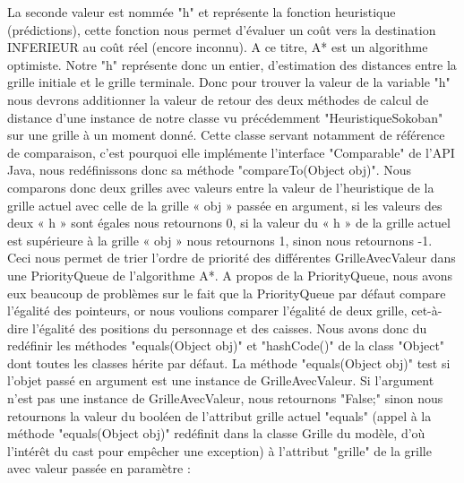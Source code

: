 \documentclass[a4paper,12pt]{article} %
\begin{document}
\newline\newline
La seconde valeur est nommée "h" et représente la fonction heuristique (prédictions), cette fonction nous permet d’évaluer un coût vers la destination INFERIEUR au coût réel (encore inconnu).
\newline
A ce titre, A* est un algorithme optimiste.
\newline
Notre "h" représente donc un entier, d’estimation des distances entre la grille initiale et le grille terminale.
\newline
Donc pour trouver la valeur de la variable "h" nous devrons additionner la valeur de retour des deux méthodes de calcul de distance d’une instance de notre classe vu précédemment "HeuristiqueSokoban" sur une grille à un moment donné. 
\newline\newline
Cette classe servant notamment de référence de comparaison, c'est pourquoi elle implémente l’interface "Comparable" de l’API Java, nous redéfinissons donc sa méthode "compareTo(Object obj)". 
\newline\newline
Nous comparons donc deux grilles avec valeurs entre la valeur de l’heuristique de la grille actuel avec celle de la grille « obj » passée en argument, si les valeurs des deux « h » sont égales nous retournons 0, si la valeur du « h » de la grille actuel est supérieure à la grille « obj » nous retournons 1, sinon nous retournons -1.
\newline\newline
Ceci nous permet de trier l’ordre de priorité des différentes GrilleAvecValeur dans une PriorityQueue de l’algorithme A*.
\newline\newline
A propos de la PriorityQueue, nous avons eux beaucoup de problèmes sur le fait que la PriorityQueue par défaut compare l’égalité des pointeurs, or nous voulions comparer l’égalité de deux grille, cet-à-dire l’égalité des positions du personnage et des caisses.
\newline\newline
Nous avons donc du redéfinir les méthodes "equals(Object obj)" et "hashCode()" de la class "Object" dont toutes les classes hérite par défaut.
\newline\newline 
La méthode "equals(Object obj)" test si l’objet passé en argument est une instance de GrilleAvecValeur. Si l'argument n'est pas une instance de GrilleAvecValeur, nous retournons "False;" sinon nous retournons la valeur du booléen de l’attribut grille actuel "equals" (appel à la méthode "equals(Object obj)" redéfinit dans la classe Grille du modèle, d’où l’intérêt du cast pour empêcher une exception)  à l’attribut "grille" de la grille avec valeur passée en paramètre : 
\end{document}
